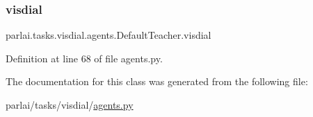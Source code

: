 \subsubsection{\texorpdfstring{visdial}{visdial}}
{\footnotesize\ttfamily parlai.\+tasks.\+visdial.\+agents.\+Default\+Teacher.\+visdial}



Definition at line 68 of file agents.\+py.



The documentation for this class was generated from the following file\+:\begin{DoxyCompactItemize}
\item 
parlai/tasks/visdial/\hyperlink{parlai_2tasks_2visdial_2agents_8py}{agents.\+py}\end{DoxyCompactItemize}

